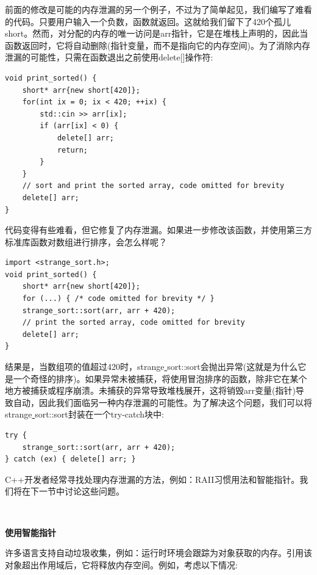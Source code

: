 前面的修改是可能的内存泄漏的另一个例子，不过为了简单起见，我们编写了难看的代码。只要用户输入一个负数，函数就返回。这就给我们留下了420个孤儿short。然而，对分配的内存的唯一访问是arr指针，它是在堆栈上声明的，因此当函数返回时，它将自动删除(指针变量，而不是指向它的内存空间)。为了消除内存泄漏的可能性，只需在函数退出之前使用delete[]操作符: \par

\begin{lstlisting}[caption={}]
void print_sorted() {
	short* arr{new short[420]};
	for(int ix = 0; ix < 420; ++ix) {
		std::cin >> arr[ix];
		if (arr[ix] < 0) {
			delete[] arr;
			return;
		}
	}
	// sort and print the sorted array, code omitted for brevity
	delete[] arr;
}
\end{lstlisting}

代码变得有些难看，但它修复了内存泄漏。如果进一步修改该函数，并使用第三方标准库函数对数组进行排序，会怎么样呢？ \par

\begin{lstlisting}[caption={}]
import <strange_sort.h>;
void print_sorted() {
	short* arr{new short[420]};
	for (...) { /* code omitted for brevity */ }
	strange_sort::sort(arr, arr + 420);
	// print the sorted array, code omitted for brevity
	delete[] arr;
}
\end{lstlisting}

结果是，当数组项的值超过420时，strange\underline{ }sort::sort会抛出异常(这就是为什么它是一个奇怪的排序)。如果异常未被捕获，将使用冒泡排序的函数，除非它在某个地方被捕获或程序崩溃。未捕获的异常导致堆栈展开，这将销毁arr变量(指针)导致自动，因此我们面临另一种内存泄漏的可能性。为了解决这个问题，我们可以将strange\underline{ }sort::sort封装在一个try-catch块中: \par

\begin{lstlisting}[caption={}]
try {
	strange_sort::sort(arr, arr + 420);
} catch (ex) { delete[] arr; }
\end{lstlisting}

C++开发者经常寻找处理内存泄漏的方法，例如：RAII习惯用法和智能指针。我们将在下一节中讨论这些问题。 \par

\noindent\textbf{}\ \par
\textbf{使用智能指针} \ \par
许多语言支持自动垃圾收集，例如：运行时环境会跟踪为对象获取的内存。引用该对象超出作用域后，它将释放内存空间。例如，考虑以下情况: \par


